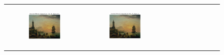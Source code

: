 \documentclass[hidelinks,12pt]{article}
\begin{document}
\begin{figure}[!h]
{\begin{tabular}{cccc}
				\begin{subfigure}[h]{0.25\textwidth}
					\centering
					\includegraphics[width=\textwidth]{figures/gaussian_filter/13.png}
				\end{subfigure} &
				\begin{subfigure}[h]{0.25\textwidth}
					\centering
					\includegraphics[width=\textwidth]{figures/gaussian_filter/14.png}
				\end{subfigure} &
				\begin{subfigure}[h]{0.25\textwidth}
					\centering

\end{subfigure}
\end{tabular}}
\end{figure}
\end{document}
